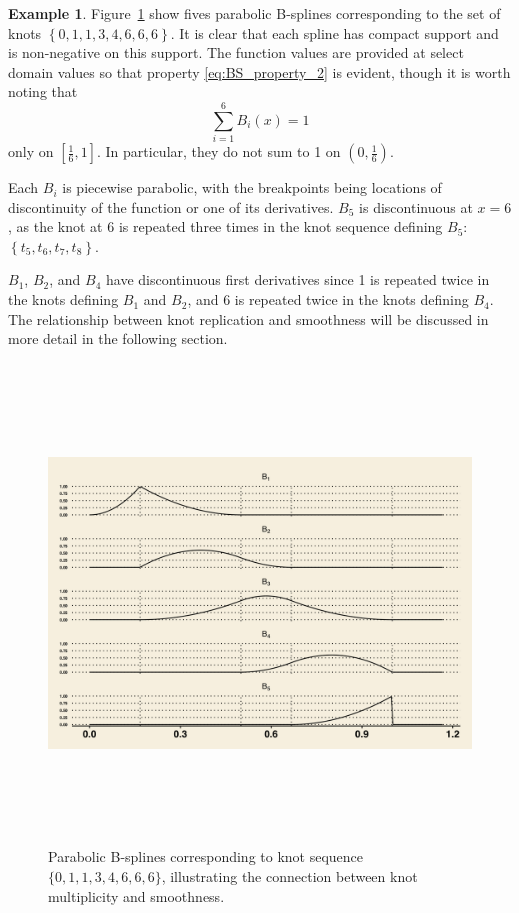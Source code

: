 \documentclass[12pt]{article}
\theoremstyle{definition}
\newtheorem{example}{Example}[section]
\begin{document}
\begin{example}
Figure~\ref{fig:deboor_bspline_basis} show fives parabolic B-splines corresponding to the set of knots $\left\{0,1,1,3,4,6,6,6 \right\}$. It is clear that each spline has compact support and is non-negative on this support. The function values are provided at select domain values so that property \ref{eq:BS_property_2} is evident, though it is worth noting that 
\[
\sum_{i=1}^6 B_i\left(x\right) = 1
\]
only on $\left[\frac{1}{6},1\right]$. In particular, they do not sum to 1 on $\left(0,\frac{1}{6}\right)$. 

Each $B_i$ is piecewise parabolic, with the breakpoints being locations of discontinuity of the function or one of its derivatives. $B_5$ is discontinuous at $x=6$, as the knot at 6 is repeated three times in the knot sequence defining $B_5$: $\left\{t_5,t_6,t_7,t_8\right\}$.

$B_1$, $B_2$, and $B_4$ have discontinuous first derivatives since 1 is repeated twice in the knots defining $B_1$ and $B_2$, and 6 is repeated twice in the knots defining $B_4$. The relationship between knot replication and smoothness will be discussed in more detail in the following section.

\begin{figure}[h]
 \begin{center}
 \graphicspath{{img/}}
  \includegraphics[width=7in, height=5in]{deboor_parabolic_bsplines.png}
  \caption{Parabolic B-splines corresponding to knot sequence $\{0,1,1,3,4,6,6,6\}$, illustrating the connection between knot multiplicity and smoothness.}\label{fig:deboor_bspline_basis}
\end{center}
\end{figure}
\end{example}
\end{document}
